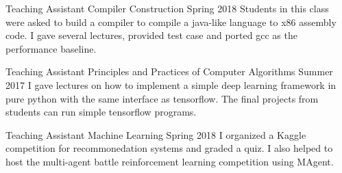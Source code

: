 

\begin{cventries}

  \cventry
    {Teaching Assistant} %
    {Compiler Construction  } %
    {Spring 2018} %
    {} %
    {Students in this class were asked to build a compiler to compile a java-like language to x86 assembly code. \quad \quad
     I gave several lectures, provided test case and ported gcc as the performance baseline.}

  \cventry
	{Teaching Assistant} %
	{Principles and Practices of Computer Algorithms } %
	{Summer 2017} %
	{} %
	{I gave lectures on how to implement a simple deep learning framework in pure python with the same interface as tensorflow. The final projects from students can run simple tensorflow programs.}

  \cventry
	{Teaching Assistant} %
	{Machine Learning } %
	{Spring 2018} %
	{} %
	{I organized a Kaggle competition for recommonedation systems and graded a quiz. I also helped to host the multi-agent battle reinforcement learning competition using MAgent.}





\end{cventries}
